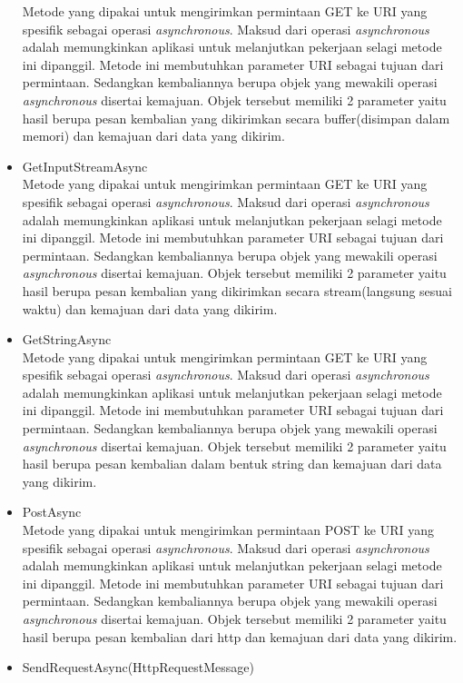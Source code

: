 \begin{itemize}
	Metode yang dipakai untuk mengirimkan permintaan GET ke URI yang spesifik sebagai operasi \textit{asynchronous}. Maksud dari operasi \textit{asynchronous} adalah memungkinkan aplikasi untuk melanjutkan pekerjaan selagi metode ini dipanggil\footnotemark[2]. Metode ini membutuhkan parameter URI sebagai tujuan dari permintaan. Sedangkan kembaliannya berupa objek yang mewakili operasi \textit{asynchronous} disertai kemajuan. Objek tersebut memiliki 2 parameter yaitu hasil berupa pesan kembalian yang dikirimkan secara buffer(disimpan dalam memori) dan kemajuan dari data yang dikirim.
	\item GetInputStreamAsync \\
	Metode yang dipakai untuk mengirimkan permintaan GET ke URI yang spesifik sebagai operasi \textit{asynchronous}. Maksud dari operasi \textit{asynchronous} adalah memungkinkan aplikasi untuk melanjutkan pekerjaan selagi metode ini dipanggil\footnotemark[2]. Metode ini membutuhkan parameter URI sebagai tujuan dari permintaan. Sedangkan kembaliannya berupa objek yang mewakili operasi \textit{asynchronous} disertai kemajuan. Objek tersebut memiliki 2 parameter yaitu hasil berupa pesan kembalian yang dikirimkan secara stream(langsung sesuai waktu) dan kemajuan dari data yang dikirim.
	\item GetStringAsync \\
	Metode yang dipakai untuk mengirimkan permintaan GET ke URI yang spesifik sebagai operasi \textit{asynchronous}. Maksud dari operasi \textit{asynchronous} adalah memungkinkan aplikasi untuk melanjutkan pekerjaan selagi metode ini dipanggil\footnotemark[2]. Metode ini membutuhkan parameter URI sebagai tujuan dari permintaan. Sedangkan kembaliannya berupa objek yang mewakili operasi \textit{asynchronous} disertai kemajuan. Objek tersebut memiliki 2 parameter yaitu hasil berupa pesan kembalian dalam bentuk string dan kemajuan dari data yang dikirim.
	\item PostAsync \\
	Metode yang dipakai untuk mengirimkan permintaan POST ke URI yang spesifik sebagai operasi \textit{asynchronous}. Maksud dari operasi \textit{asynchronous} adalah memungkinkan aplikasi untuk melanjutkan pekerjaan selagi metode ini dipanggil\footnotemark[2]. Metode ini membutuhkan parameter URI sebagai tujuan dari permintaan. Sedangkan kembaliannya berupa objek yang mewakili operasi \textit{asynchronous} disertai kemajuan. Objek tersebut memiliki 2 parameter yaitu hasil berupa pesan kembalian dari http dan kemajuan dari data yang dikirim.
	\item SendRequestAsync(HttpRequestMessage) \\

\end{itemize}
